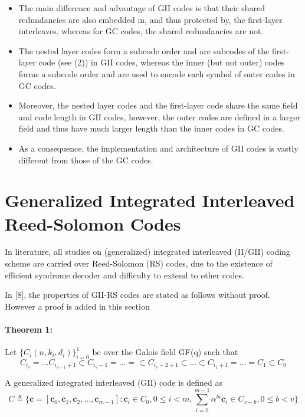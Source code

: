 \documentclass[fontsize=12pt]{article}
\begin{document}
 \begin{itemize}
 \item The main
difference and advantage of GII codes is that their shared
redundancies are also embedded in, and thus protected by,
the first-layer interleaves, whereas for GC codes, the shared
redundancies are not.

\item The nested layer codes form a subcode
order and are subcodes of the first-layer code (see (2)) in
GII codes, whereas the inner (but not outer) codes forms a
subcode order and are used to encode each symbol of outer
codes in GC codes.

\item  Moreover, the nested layer codes and
the first-layer code share the same field and code length in
GII codes, however, the outer codes are defined in a larger
field and thus have much larger length than the inner codes
in GC codes. 

\item As a consequence, the implementation and
architecture of GII codes is vastly different from those of the
GC codes.
 \end{itemize}
 
 
 \section{Generalized Integrated Interleaved
Reed-Solomon Codes}
In literature, all studies on (generalized) integrated
interleaved (II/GII) coding scheme are carried over
Reed-Solomon (RS) codes, due to the existence of efficient
syndrome decoder and difficulty to extend to other codes.

In [8], the properties of GII-RS codes are stated as follows
without proof. However a proof is added in this section
 
\paragraph{Theorem 1: }Let $\{\mathit{C}_i(n,k_i,d_i)\}_{i=0}^1$ be over the Galois field GF(q) such
that
\begin{equation}
\mathit{C}_{i_s}  =. . . \mathit{C}_{i_{{s}-1}+1} \subset \mathit{C}_{{i_s} - 1} = . . .= \subset \mathit{C}_{i_s - 2+1} \subset . . . \subset \mathit{C}_{i_1 +1} =. . .= \mathit{C}_1 \subset \mathit{C}_0
\end{equation}
 
 A generalized integrated interleaved (GII) code is defined as
 \begin{equation}
\mathit{C}
\triangleq \Big\{
\mathbf{c} = [\mathbf{c} _0, \mathbf{c} _1, \mathbf{c}_2, . . . , \mathbf{c} _{m−1}] : \mathbf{c}_i \in \mathit{C}_0, 0 \leq i < m,
\sum^{m−1}_{i=0}α^{bi} \mathbf{c}_i \in \mathit{C}_{v−b}, 0 \leq b < v \Big\}
\end{equation}
 
\end{document}
